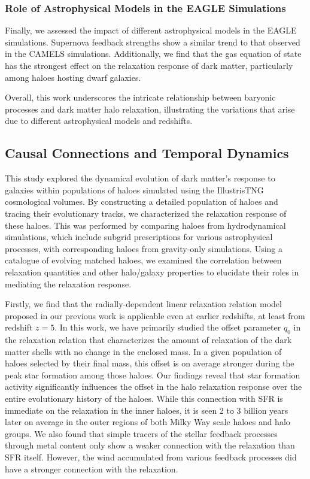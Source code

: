 \subsubsection*{Role of Astrophysical Models in the EAGLE Simulations}
Finally, we assessed the impact of different astrophysical models in the EAGLE simulations. Supernova feedback strengths show a similar trend to that observed in the CAMELS simulations. Additionally, we find that the gas equation of state has the strongest effect on the relaxation response of dark matter, particularly among haloes hosting dwarf galaxies.

Overall, this work underscores the intricate relationship between baryonic processes and dark matter halo relaxation, illustrating the variations that arise due to different astrophysical models and redshifts.

\subsection{Causal Connections and Temporal Dynamics}
This study explored the dynamical evolution of dark matter's response to galaxies within populations of haloes simulated using the IllustrisTNG cosmological volumes. By constructing a detailed population of haloes and tracing their evolutionary tracks, we characterized the relaxation response of these haloes. This was performed by comparing haloes from hydrodynamical simulations, which include subgrid prescriptions for various astrophysical processes, with corresponding haloes from gravity-only simulations. Using a catalogue of evolving matched haloes, we examined the correlation between relaxation quantities and other halo/galaxy properties to elucidate their roles in mediating the relaxation response.

Firstly, we find that the radially-dependent linear relaxation relation model proposed in our previous work is applicable even at earlier redshifts, at least from redshift $z=5$. In this work, we have primarily studied the offset parameter $q_0$ in the relaxation relation that characterizes the amount of relaxation of the dark matter shells with no change in the enclosed mass. In a given population of haloes selected by their final mass, this offset is on average stronger during the peak star formation among those haloes.
Our findings reveal that star formation activity significantly influences the offset in the halo relaxation response over the entire evolutionary history of the haloes. While this connection with SFR is immediate on the relaxation in the inner haloes, it is seen 2 to 3 billion years later on average in the outer regions of both Milky Way scale haloes and halo groups.
We also found that simple tracers of the stellar feedback processes through metal content only show a weaker connection with the relaxation than SFR itself. However, the wind accumulated from various feedback processes did have a stronger connection with the relaxation.

